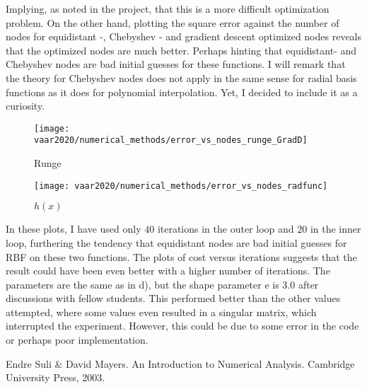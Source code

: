 Implying, as noted in the project, that this is a more difficult optimization problem. On the other hand, plotting the square error against the number of nodes for equidistant -, Chebyshev - and gradient descent optimized nodes reveals that the optimized nodes are much better. Perhaps hinting that equidistant- and Chebyshev nodes are bad initial guesses for these functions. I will remark that the theory for Chebyshev nodes does not apply in the same sense for radial basis functions as it does for polynomial interpolation. Yet, I decided to include it as a curiosity.
\begin{figure}[H]
    \centering
    \begin{minipage}{0.45\textwidth}
        \centering
        \texttt{[image: vaar2020/numerical\_methods/error\_vs\_nodes\_runge\_GradD]} %
        \caption{Runge}
    \end{minipage}\hfill
    \begin{minipage}{0.45\textwidth}
        \centering
        \texttt{[image: vaar2020/numerical\_methods/error\_vs\_nodes\_radfunc]} %
        \caption{$h(x)$}
    \end{minipage}
\end{figure}
In these plots, I have used only $40$ iterations in the outer loop and $20$ in the inner loop, furthering the tendency that equidistant nodes are bad initial guesses for RBF on these two functions. The plots of cost versus iterations suggests that the result could have been even better with a higher number of iterations. The parameters are the same as in d), but the shape parameter e is 3.0 after discussions with fellow students. This performed better than the other values attempted, where some values even resulted in a singular matrix, which interrupted the experiment. However, this could be due to some error in the code or perhaps poor implementation.

\begin{thebibliography}{9}
  \bibitem Endre Suli & David Mayers. An Introduction to Numerical Analysis. Cambridge University Press, 2003.\label{NumAnal}
\end{thebibliography}
